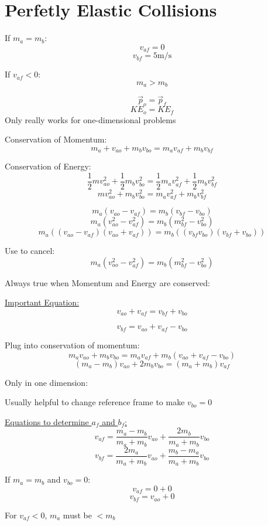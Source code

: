 \documentclass[fleqn]{article}
\begin{document}
\setlength{\mathindent}{0pt}
\section*{Perfetly Elastic Collisions}

If $m_a = m_b$:
\[ v _{af} = 0\]
\[ v _{bf} = 5 \text{m/s} \]

\bigbreak
If $v _{af} < 0$:
\[ m_a >  m_b \]

\[ \vec{p}_{o} = \vec{p}_{f}     \]
\[ KE_o=KE_f \]
Only really works for one-dimensional problems

Conservation of Momentum:
\[ m_a+v _{ao}+m_b v _{bo} = m_av _{af} + m_bv _{bf}     \]

Conservation of Energy:
\[ \frac{1}{2} mv _{ao}^2 + \frac{1}{2} m_bv _{bo}^2 = \frac{1}{2} m_a v _{af}^2 + \frac{1}{2} m_b v _{bf}^2     \]
\[ mv _{ao}^2 + m_bv _{bo}^2 = m_a v _{af}^2 + m_b v _{bf}^2     \]

\[ m_a(v _{ao} - v _{af} ) = m_b(v _{bf} - v _{bo}  ) \]
\[ m_a(v _{ao}^2 - v _{af}^2)= m_b(m _{bf}^2 - v _{bo}^2  ) \]
\[ m_a((v _{ao} - v _{af}  )(v _{ao} + v _{ af}  )) = m_b((v _{bf} v _{bo})(v _{bf} + v _{bo}  ))\]

Use to cancel:
\[ m_a(v _{ao}^2 - v _{af}^2)= m_b(m _{bf}^2 - v _{bo}^2  ) \]

Always true when Momentum and Energy are conserved:

\underline{Important Equation:}
\[ v _{ao} + v _{af} = v _{bf} + v _{bo}     \]

\[ v _{bf} = v _{ao} + v _{af} - v _{bo}     \]

Plug into conservation of momentum:
\[ m_a v _{ao} + m_bv _{bo} = m_a v _{af} + m_b(v _{ao} + v _{af} - v _{bo}   )    \]
\[ (m_a-m_b)v _{ao} + 2m_bv _{bo} = (m_a+m_b)v _{af}  \]

Only in one dimension:

Usually helpful to change reference frame to make $v _{bo} = 0$

\underline{Equations to determine $a_f$ and $b_f$:}
\[ v _{af} = \frac{m_a-m_b}{m_a+m_b} v _{ao} + \frac{2  m_b }{m_a+m_b}v _{bo}      \]
\[ v _{bf} = \frac{2m_a}{m_a+m_b}v _{ao}  + \frac{m_b-m_a}{m_a+m_b} v _{bo}   \]


If $m_a=m_b$ and $v _{bo}=0$:
\[ v _{af} = 0 + 0 \]
\[ v _{bf} = v _{ao} + 0    \]

For $v _{af} < 0$, $m_a$ must be $< m_b$
\end{document}
